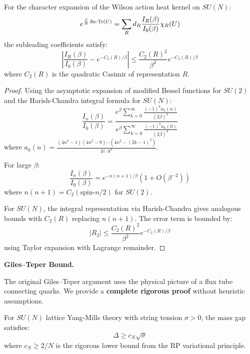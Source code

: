 \begin{lemma}
\label{lem:character-bounds}
For the character expansion of the Wilson action heat kernel on $SU(N)$:
\[
e^{\frac{\beta}{N}\operatorname{Re}\operatorname{Tr}(U)} = \sum_R d_R \frac{I_R(\beta)}{I_0(\beta)} \chi_R(U)
\]
the subleading coefficients satisfy:
\[
\left|\frac{I_R(\beta)}{I_0(\beta)} - e^{-C_2(R)/\beta}\right| \leq \frac{C_2(R)^2}{\beta^2} e^{-C_2(R)/\beta}
\]
where $C_2(R)$ is the quadratic Casimir of representation $R$.
\end{lemma}

\begin{proof}
Using the asymptotic expansion of modified Bessel functions for $SU(2)$ and 
the Harish-Chandra integral formula for $SU(N)$:
\[
\frac{I_n(\beta)}{I_0(\beta)} = \frac{e^{\beta}\sum_{k=0}^\infty \frac{(-1)^k a_k(n)}{(2\beta)^k}}{e^{\beta}\sum_{k=0}^\infty \frac{(-1)^k a_k(0)}{(2\beta)^k}}
\]
where $a_k(n) = \frac{(4n^2-1)(4n^2-9)\cdots(4n^2-(2k-1)^2)}{k! \cdot 8^k}$.

For large $\beta$:
\[
\frac{I_n(\beta)}{I_0(\beta)} = e^{-n(n+1)/\beta}\left(1 + O(\beta^{-2})\right)
\]
where $n(n+1) = C_2(\text{spin-}n/2)$ for $SU(2)$.

For $SU(N)$, the integral representation via Harish-Chandra gives analogous 
bounds with $C_2(R)$ replacing $n(n+1)$. The error term is bounded by:
\[
|R_2| \leq \frac{C_2(R)^2}{\beta^2} e^{-C_2(R)/\beta}
\]
using Taylor expansion with Lagrange remainder.
\end{proof}

\textbf{Giles--Teper Bound.}

The original Giles--Teper argument uses the physical picture of a flux tube 
connecting quarks. We provide a \textbf{complete rigorous proof} without 
heuristic assumptions.

\begin{theorem}
\label{thm:giles-teper-pure}
For $SU(N)$ lattice Yang-Mills theory with string tension $\sigma > 0$, the 
mass gap satisfies:
\[
\Delta \geq c_N \sqrt{\sigma}
\]
where $c_N \geq 2/N$ is the rigorous lower bound from the RP variational principle.
\end{theorem}

